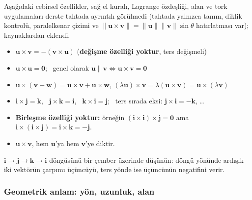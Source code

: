 \begin{bilgi}
Aşağıdaki cebirsel özellikler, sağ el kuralı, Lagrange özdeşliği, alan ve tork uygulamaları derste tahtada ayrıntılı görülmedi (tahtada yalnızca tanım, diklik kontrolü, paralelkenar çizimi ve $\|\mathbf u\times\mathbf v\|=\|\mathbf u\|\|\mathbf v\|\sin\theta$ hatırlatması var); kaynaklardan eklendi.
\end{bilgi}

\begin{teorem}
\begin{itemize}
\item $\mathbf u\times\mathbf v=-(\mathbf v\times\mathbf u)$ \quad (\textbf{değişme özelliği yoktur}, ters değişmeli)
\item $\mathbf u\times\mathbf u=\mathbf 0$; \ genel olarak $\mathbf u\parallel\mathbf v\iff\mathbf u\times\mathbf v=\mathbf 0$
\item $\mathbf u\times(\mathbf v+\mathbf w)=\mathbf u\times\mathbf v+\mathbf u\times\mathbf w$, \quad $(\lambda\mathbf u)\times\mathbf v=\lambda(\mathbf u\times\mathbf v)=\mathbf u\times(\lambda\mathbf v)$
\item $\mathbf i\times\mathbf j=\mathbf k$, \ $\mathbf j\times\mathbf k=\mathbf i$, \ $\mathbf k\times\mathbf i=\mathbf j$; \ ters sırada eksi: $\mathbf j\times\mathbf i=-\mathbf k$, \ldots
\item \textbf{Birleşme özelliği yoktur:} örneğin $(\mathbf i\times\mathbf i)\times\mathbf j=\mathbf 0$ ama $\mathbf i\times(\mathbf i\times\mathbf j)=\mathbf i\times\mathbf k=-\mathbf j$.
\item $\mathbf u\times\mathbf v$, hem $\mathbf u$'ya hem $\mathbf v$'ye diktir.
\end{itemize}
\end{teorem}

$\mathbf i\to\mathbf j\to\mathbf k\to\mathbf i$ döngüsünü bir çember üzerinde düşünün: döngü yönünde ardışık iki vektörün çarpımı üçüncüyü, ters yönde ise üçüncünün negatifini verir.

\subsubsection{Geometrik anlam: yön, uzunluk, alan}

